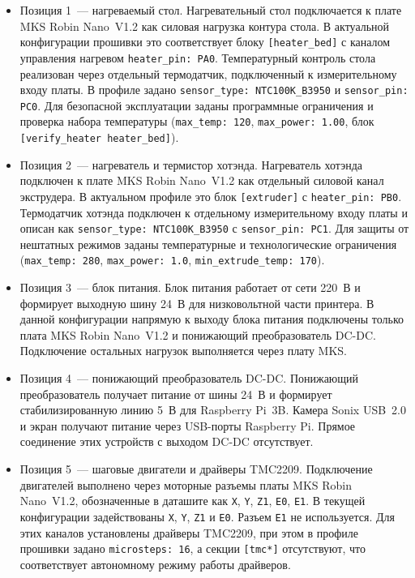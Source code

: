 \begin{itemize}
\item Позиция 1~--- нагреваемый стол. Нагревательный стол подключается к плате MKS Robin Nano~V1.2 как силовая нагрузка контура стола. В актуальной конфигурации прошивки это соответствует блоку \texttt{[heater\_bed]} с каналом управления нагревом \texttt{heater\_pin: PA0}. Температурный контроль стола реализован через отдельный термодатчик, подключенный к измерительному входу платы. В профиле задано \texttt{sensor\_type: NTC100K\_B3950} и \texttt{sensor\_pin: PC0}. Для безопасной эксплуатации заданы программные ограничения и проверка набора температуры (\texttt{max\_temp: 120}, \texttt{max\_power: 1.00}, блок \texttt{[verify\_heater heater\_bed]}).

\item Позиция 2~--- нагреватель и термистор хотэнда. Нагреватель хотэнда подключен к плате MKS Robin Nano~V1.2 как отдельный силовой канал экструдера. В актуальном профиле это блок \texttt{[extruder]} с \texttt{heater\_pin: PB0}. Термодатчик хотэнда подключен к отдельному измерительному входу платы и описан как \texttt{sensor\_type: NTC100K\_B3950} с \texttt{sensor\_pin: PC1}. Для защиты от нештатных режимов заданы температурные и технологические ограничения (\texttt{max\_temp: 280}, \texttt{max\_power: 1.0}, \texttt{min\_extrude\_temp: 170}).

\item Позиция 3~--- блок питания. Блок питания работает от сети 220~В и формирует выходную шину 24~В для низковольтной части принтера. В данной конфигурации напрямую к выходу блока питания подключены только плата MKS Robin Nano~V1.2 и понижающий преобразователь DC-DC. Подключение остальных нагрузок выполняется через плату MKS.

\item Позиция 4~--- понижающий преобразователь DC-DC. Понижающий преобразователь получает питание от шины 24~В и формирует стабилизированную линию 5~В для Raspberry Pi~3B. Камера Sonix USB~2.0 и экран получают питание через USB-порты Raspberry Pi. Прямое соединение этих устройств с выходом DC-DC отсутствует.

\item Позиция 5~--- шаговые двигатели и драйверы TMC2209. Подключение двигателей выполнено через моторные разъемы платы MKS Robin Nano~V1.2, обозначенные в даташите как \texttt{X}, \texttt{Y}, \texttt{Z1}, \texttt{E0}, \texttt{E1}. В текущей конфигурации задействованы \texttt{X}, \texttt{Y}, \texttt{Z1} и \texttt{E0}. Разъем \texttt{E1} не используется. Для этих каналов установлены драйверы TMC2209, при этом в профиле прошивки задано \texttt{microsteps: 16}, а секции \texttt{[tmc*]} отсутствуют, что соответствует автономному режиму работы драйверов.


\end{itemize}
